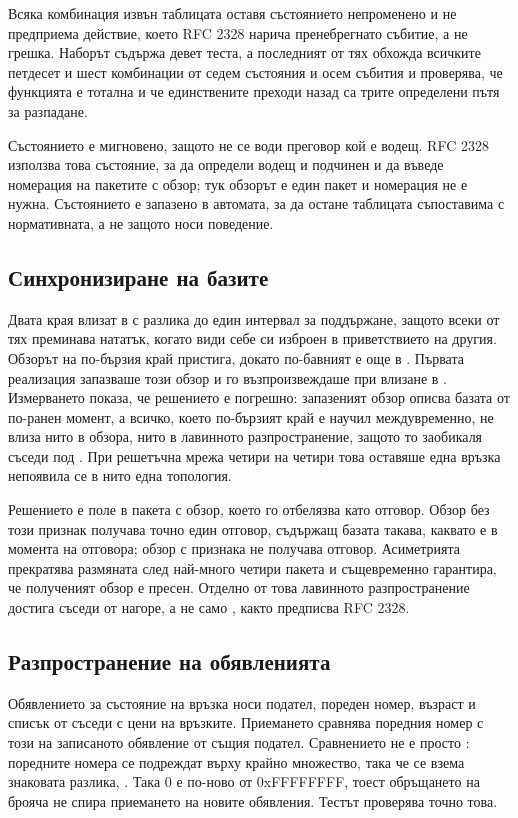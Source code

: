 Всяка комбинация извън таблицата оставя състоянието непроменено и не предприема действие,
което RFC 2328 нарича пренебрегнато събитие, а не грешка. Наборът  съдържа
девет теста, а последният от тях обхожда всичките петдесет и шест комбинации от седем
състояния и осем събития и проверява, че функцията е тотална и че единствените преходи
назад са трите определени пътя за разпадане.

Състоянието  е мигновено, защото не се води преговор кой е водещ. RFC 2328
използва това състояние, за да определи водещ и подчинен и да въведе номерация на пакетите
с обзор; тук обзорът е един пакет и номерация не е нужна. Състоянието е запазено в
автомата, за да остане таблицата съпоставима с нормативната, а не защото носи поведение.

\subsection{Синхронизиране на базите}

Двата края влизат в  с разлика до един интервал за поддържане, защото всеки
от тях преминава нататък, когато види себе си изброен в приветствието на другия. Обзорът
на по-бързия край пристига, докато по-бавният е още в . Първата реализация
запазваше този обзор и го възпроизвеждаше при влизане в . Измерването
показа, че решението е погрешно: запазеният обзор описва базата от по-ранен момент, а
всичко, което по-бързият край е научил междувременно, не влиза нито в обзора, нито в
лавинното разпространение, защото то заобикаля съседи под . При решетъчна
мрежа четири на четири това оставяше една връзка непоявила се в нито една топология.

Решението е поле в пакета с обзор, което го отбелязва като отговор. Обзор без този
признак получава точно един отговор, съдържащ базата такава, каквато е в момента на
отговора; обзор с признака не получава отговор. Асиметрията прекратява размяната след
най-много четири пакета и същевременно гарантира, че полученият обзор е пресен. Отделно
от това лавинното разпространение достига съседи от  нагоре, а не само
, както предписва RFC 2328.

\subsection{Разпространение на обявленията}

Обявлението за състояние на връзка носи подател, пореден номер, възраст и списък от
съседи с цени на връзките. Приемането сравнява поредния номер с този на записаното
обявление от същия подател. Сравнението не е просто \code{>}: поредните номера се
подреждат върху крайно множество, така че се взема знаковата разлика,
. Така 0 е по-ново от 0xFFFFFFFF, тоест обръщането на брояча
не спира приемането на новите обявления. Тестът
 проверява точно това.

